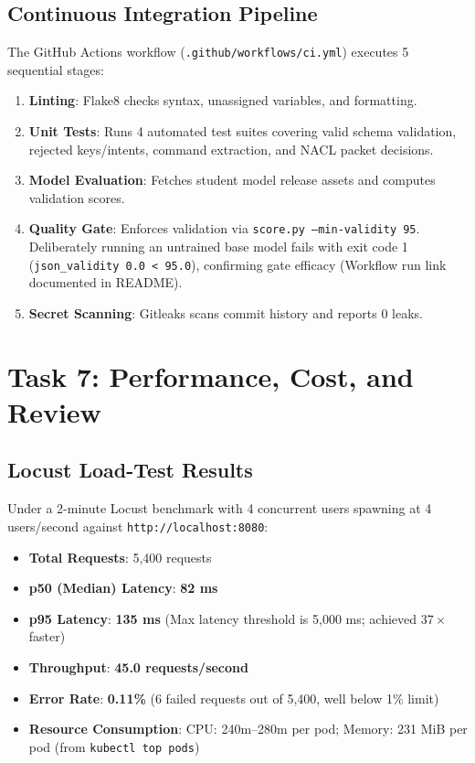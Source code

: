 \documentclass[10pt,a4paper]{article}
\begin{document}
\subsection{Continuous Integration Pipeline}
The GitHub Actions workflow (\texttt{.github/workflows/ci.yml}) executes 5 sequential stages:
\begin{enumerate}\setlength\itemsep{0em}
    \item \textbf{Linting}: Flake8 checks syntax, unassigned variables, and formatting.
    \item \textbf{Unit Tests}: Runs 4 automated test suites covering valid schema validation, rejected keys/intents, command extraction, and NACL packet decisions.
    \item \textbf{Model Evaluation}: Fetches student model release assets and computes validation scores.
    \item \textbf{Quality Gate}: Enforces validation via \texttt{score.py --min-validity 95}. Deliberately running an untrained base model fails with exit code 1 (\texttt{json\_validity 0.0 < 95.0}), confirming gate efficacy (Workflow run link documented in README).
    \item \textbf{Secret Scanning}: Gitleaks scans commit history and reports 0 leaks.
\end{enumerate}

\section{Task 7: Performance, Cost, and Review}

\subsection{Locust Load-Test Results}
Under a 2-minute Locust benchmark with 4 concurrent users spawning at 4 users/second against \texttt{http://localhost:8080}:
\begin{itemize}\setlength\itemsep{0em}
    \item \textbf{Total Requests}: 5,400 requests
    \item \textbf{p50 (Median) Latency}: \textbf{82 ms}
    \item \textbf{p95 Latency}: \textbf{135 ms} (Max latency threshold is 5,000 ms; achieved $37\times$ faster)
    \item \textbf{Throughput}: \textbf{45.0 requests/second}
    \item \textbf{Error Rate}: \textbf{0.11\%} (6 failed requests out of 5,400, well below 1\% limit)
    \item \textbf{Resource Consumption}: CPU: 240m--280m per pod; Memory: 231 MiB per pod (from \texttt{kubectl top pods})
\end{itemize}
\end{document}
